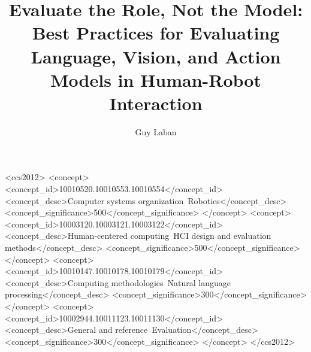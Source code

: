 \documentclass[manuscript,screen,review]{acmart}
\begin{document}
\title[Evaluate the Role, Not the Model]{Evaluate the Role, Not the Model: Best Practices for Evaluating Language, Vision, and Action Models in Human-Robot Interaction}

\author{Guy Laban}


\renewcommand{\shortauthors}{Laban}



\begin{CCSXML}
<ccs2012>
   <concept>
       <concept_id>10010520.10010553.10010554</concept_id>
       <concept_desc>Computer systems organization~Robotics</concept_desc>
       <concept_significance>500</concept_significance>
       </concept>
   <concept>
       <concept_id>10003120.10003121.10003122</concept_id>
       <concept_desc>Human-centered computing~HCI design and evaluation methods</concept_desc>
       <concept_significance>500</concept_significance>
       </concept>
   <concept>
       <concept_id>10010147.10010178.10010179</concept_id>
       <concept_desc>Computing methodologies~Natural language processing</concept_desc>
       <concept_significance>300</concept_significance>
       </concept>
   <concept>
       <concept_id>10002944.10011123.10011130</concept_id>
       <concept_desc>General and reference~Evaluation</concept_desc>
       <concept_significance>300</concept_significance>
       </concept>
 </ccs2012>
\end{CCSXML}



\maketitle










\end{document}
